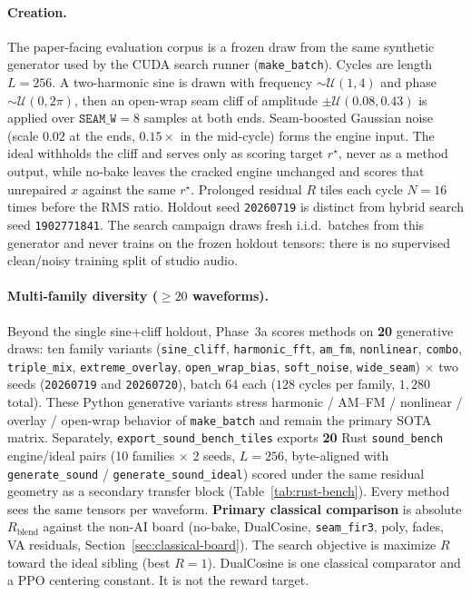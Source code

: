 \paragraph{Creation.}
The paper-facing evaluation corpus is a frozen draw from the same synthetic generator used by the CUDA search runner (\texttt{make\_batch}).
Cycles are length $L{=}256$.
A two-harmonic sine is drawn with frequency $\sim\mathcal{U}(1,4)$ and phase $\sim\mathcal{U}(0,2\pi)$, then an open-wrap seam cliff of amplitude $\pm\mathcal{U}(0.08,0.43)$ is applied over $\texttt{SEAM\_W}{=}8$ samples at both ends.
Seam-boosted Gaussian noise (scale $0.02$ at the ends, $0.15\times$ in the mid-cycle) forms the engine input.
The ideal withholds the cliff and serves only as scoring target $r^{\star}$, never as a method output, while no-bake leaves the cracked engine unchanged and scores that unrepaired $x$ against the same $r^{\star}$.
Prolonged residual $R$ tiles each cycle $N{=}16$ times before the RMS ratio.
Holdout seed \texttt{20260719} is distinct from hybrid search seed \texttt{1902771841}.
The search campaign draws fresh i.i.d.\ batches from this generator and never trains on the frozen holdout tensors: there is no supervised clean/noisy training split of studio audio.

\paragraph{Multi-family diversity ($\ge 20$ waveforms).}
Beyond the single sine{+}cliff holdout, Phase~3a scores methods on \textbf{20} generative draws: ten family variants (\texttt{sine\_cliff}, \texttt{harmonic\_fft}, \texttt{am\_fm}, \texttt{nonlinear}, \texttt{combo}, \texttt{triple\_mix}, \texttt{extreme\_overlay}, \texttt{open\_wrap\_bias}, \texttt{soft\_noise}, \texttt{wide\_seam}) $\times$ two seeds (\texttt{20260719} and \texttt{20260720}), batch 64 each ($128$ cycles per family, $1{,}280$ total).
These Python generative variants stress harmonic / AM--FM / nonlinear / overlay / open-wrap behavior of \texttt{make\_batch} and remain the primary SOTA matrix.
Separately, \texttt{export\_sound\_bench\_tiles} exports \textbf{20} Rust \texttt{sound\_bench} engine/ideal pairs (10 families $\times$ 2 seeds, $L{=}256$, byte-aligned with \texttt{generate\_sound} / \texttt{generate\_sound\_ideal}) scored under the same residual geometry as a secondary transfer block (Table~\ref{tab:rust-bench}).
Every method sees the same tensors per waveform.
\textbf{Primary classical comparison} is absolute $R_{\mathrm{blend}}$ against the non-AI board (no-bake, DualCosine, \texttt{seam\_fir3}, poly, fades, VA residuals, Section~\ref{sec:classical-board}).
The search objective is maximize $R$ toward the ideal sibling (best $R{=}1$).
DualCosine is one classical comparator and a PPO centering constant.
It is not the reward target.

